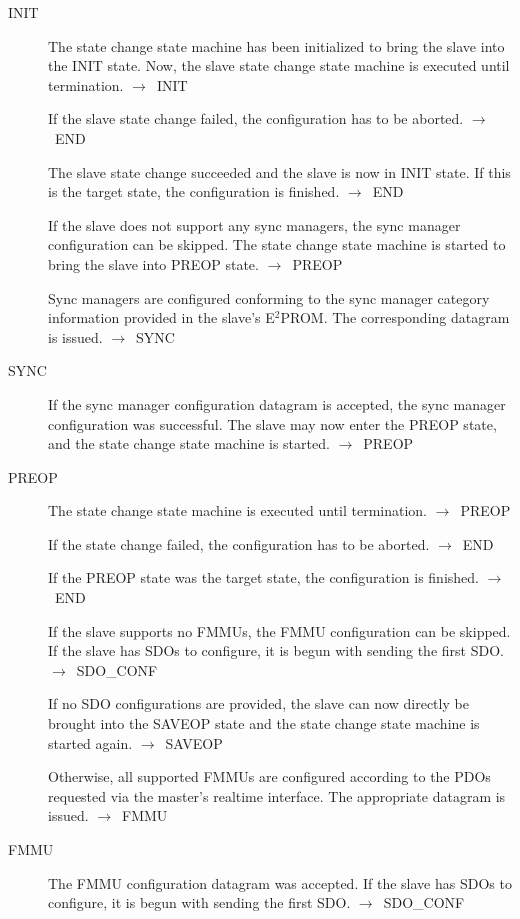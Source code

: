 \documentclass[a4paper,12pt,BCOR6mm,bibtotoc,idxtotoc]{scrbook}
\begin{document}
\begin{description}
\item[INIT] The state change state machine has been initialized to
  bring the slave into the INIT state. Now, the slave state change
  state machine is executed until termination. $\rightarrow$~INIT

  If the slave state change failed, the configuration has to be
  aborted. $\rightarrow$~END

  The slave state change succeeded and the slave is now in INIT state.
  If this is the target state, the configuration is finished.
  $\rightarrow$~END

  If the slave does not support any sync managers, the sync manager
  configuration can be skipped. The state change state machine is
  started to bring the slave into PREOP state.
  $\rightarrow$~PREOP

  Sync managers are configured conforming to the sync manager category
  information provided in the slave's E$^2$PROM. The corresponding
  datagram is issued. $\rightarrow$~SYNC

\item[SYNC] If the sync manager configuration datagram is accepted,
  the sync manager configuration was successful. The slave may now
  enter the PREOP state, and the state change state machine is
  started. $\rightarrow$~PREOP

\item[PREOP] The state change state machine is executed until
  termination. $\rightarrow$~PREOP

  If the state change failed, the configuration has to be aborted.
  $\rightarrow$~END

  If the PREOP state was the target state, the configuration is
  finished. $\rightarrow$~END

  If the slave supports no FMMUs, the FMMU configuration can be
  skipped. If the slave has SDOs to configure, it is begun with
  sending the first SDO. $\rightarrow$~SDO\_CONF

  If no SDO configurations are provided, the slave can now directly be
  brought into the SAVEOP state and the state change state machine is
  started again. $\rightarrow$~SAVEOP

  Otherwise, all supported FMMUs are configured according to the PDOs
  requested via the master's realtime interface. The appropriate
  datagram is issued. $\rightarrow$~FMMU

\item[FMMU] The FMMU configuration datagram was accepted. If the slave
  has SDOs to configure, it is begun with sending the first SDO.
  $\rightarrow$~SDO\_CONF


\end{description}
\end{document}
